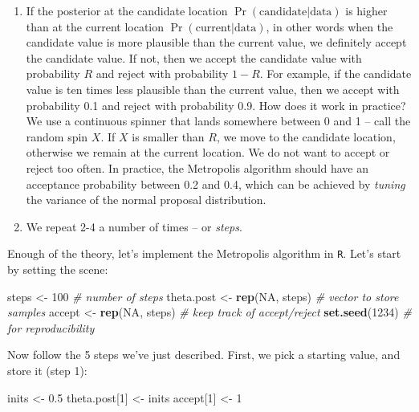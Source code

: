 \documentclass[
  12pt,
]{krantz}
\newenvironment{Shaded}{\begin{snugshade}}{\end{snugshade}}
\newcommand{\CommentTok}[1]{\textcolor[rgb]{0.56,0.35,0.01}{\textit{#1}}}
\newcommand{\ConstantTok}[1]{\textcolor[rgb]{0.56,0.35,0.01}{#1}}
\newcommand{\DecValTok}[1]{\textcolor[rgb]{0.00,0.00,0.81}{#1}}
\newcommand{\FloatTok}[1]{\textcolor[rgb]{0.00,0.00,0.81}{#1}}
\newcommand{\FunctionTok}[1]{\textcolor[rgb]{0.13,0.29,0.53}{\textbf{#1}}}
\newcommand{\NormalTok}[1]{#1}
\newcommand{\OtherTok}[1]{\textcolor[rgb]{0.56,0.35,0.01}{#1}}
\begin{document}
\begin{enumerate}
\def\labelenumi{\arabic{enumi}.}
\setcounter{enumi}{3}
\item
  If the posterior at the candidate location \(\Pr(\text{candidate}|\text{data})\) is higher than at the current location \(\Pr(\text{current}|\text{data})\), in other words when the candidate value is more plausible than the current value, we definitely accept the candidate value. If not, then we accept the candidate value with probability \(R\) and reject with probability \(1-R\). For example, if the candidate value is ten times less plausible than the current value, then we accept with probability 0.1 and reject with probability 0.9. How does it work in practice? We use a continuous spinner that lands somewhere between 0 and 1 -- call the random spin \(X\). If \(X\) is smaller than \(R\), we move to the candidate location, otherwise we remain at the current location. We do not want to accept or reject too often. In practice, the Metropolis algorithm should have an acceptance probability between 0.2 and 0.4, which can be achieved by \emph{tuning} the variance of the normal proposal distribution.
\item
  We repeat 2-4 a number of times -- or \emph{steps}.
\end{enumerate}

Enough of the theory, let's implement the Metropolis algorithm in \texttt{R}. Let's start by setting the scene:

\begin{Shaded}
\begin{Highlighting}[]
\NormalTok{steps }\OtherTok{\textless{}{-}} \DecValTok{100} \CommentTok{\# number of steps}
\NormalTok{theta.post }\OtherTok{\textless{}{-}} \FunctionTok{rep}\NormalTok{(}\ConstantTok{NA}\NormalTok{, steps) }\CommentTok{\# vector to store samples}
\NormalTok{accept }\OtherTok{\textless{}{-}} \FunctionTok{rep}\NormalTok{(}\ConstantTok{NA}\NormalTok{, steps) }\CommentTok{\# keep track of accept/reject}
\FunctionTok{set.seed}\NormalTok{(}\DecValTok{1234}\NormalTok{) }\CommentTok{\# for reproducibility}
\end{Highlighting}
\end{Shaded}

Now follow the 5 steps we've just described. First, we pick a starting value, and store it (step 1):

\begin{Shaded}
\begin{Highlighting}[]
\NormalTok{inits }\OtherTok{\textless{}{-}} \FloatTok{0.5}
\NormalTok{theta.post[}\DecValTok{1}\NormalTok{] }\OtherTok{\textless{}{-}}\NormalTok{ inits}
\NormalTok{accept[}\DecValTok{1}\NormalTok{] }\OtherTok{\textless{}{-}} \DecValTok{1}
\end{Highlighting}
\end{Shaded}
\end{document}
